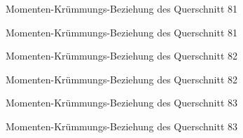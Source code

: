 \documentclass[
  11pt,
  letterpaper,
]{scrreprt}
\begin{document}
\begin{figure}[H]


\caption{\label{fig-qs_81}Momenten-Krümmungs-Beziehung des Querschnitt
81}

\end{figure}%

\begin{figure}[H]


\caption{\label{fig-m_chi_81}Momenten-Krümmungs-Beziehung des
Querschnitt 81}

\end{figure}%

\begin{figure}[H]


\caption{\label{fig-qs_82}Momenten-Krümmungs-Beziehung des Querschnitt
82}

\end{figure}%

\begin{figure}[H]


\caption{\label{fig-m_chi_82}Momenten-Krümmungs-Beziehung des
Querschnitt 82}

\end{figure}%

\begin{figure}[H]


\caption{\label{fig-qs_83}Momenten-Krümmungs-Beziehung des Querschnitt
83}

\end{figure}%

\begin{figure}[H]


\caption{\label{fig-m_chi_83}Momenten-Krümmungs-Beziehung des
Querschnitt 83}

\end{figure}%
\end{document}
